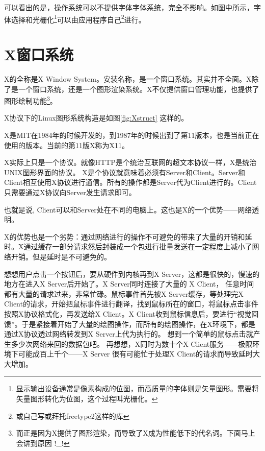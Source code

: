 
可以看出的是，操作系统可以不提供字体字体系统，完全不影响。如图中所示，字体选择和光栅化\footnote{显示输出设备通常是像素构成的位图，而高质量的字体则是矢量图形。需要将矢量图形转化为位图，这个过程叫光栅化。}可以由应用程序自己\footnote{或自己写或拜托freetype2这样的库}进行。

\section{X窗口系统}

X的全称是X Window System。安装名称，是一个窗口系统。其实并不全面。X除了是一个窗口系统，还是一个图形渲染系统。X不仅提供窗口管理功能，也提供了图形绘制功能\footnote{而正是因为X提供了图形渲染，而导致了X成为性能低下的代名词。下面马上会讲到原因 !\_!}。

X协议下的Linux图形系统构造是如图\ref{fig:Xstruct} 这样的。

X是MIT在1984年的时候开发的，到1987年的时候出到了第11版本，也是当前正在使用的版本。当前的第11版X称为X11。

X实际上只是一个协议。就像HTTP是个统治互联网的超文本协议一样，X是统治UNIX图形界面的协议。
X是个协议就意味着必须有Server和Client。Server和Client相互使用X协议进行通信。所有的操作都是Server代为Client进行的。Client只需要通过X协议向Server发生请求即可。

也就是说, Client可以和Server处在不同的电脑上。这也是X的一个优势——网络透明。


X的优势也是一个劣势：通过网络进行的操作不可避免的带来了大量的开销和延时。X通过缓存一部分请求然后封装成一个包进行批量发送在一定程度上减小了网络开销。但是延时是不可避免的。

\begin{notice}

想想用户点击一个按钮后，要从硬件到内核再到X Server，这都是很快的，慢速的地方在进入X Server后开始了。X Server同时连接了大量的 X Client， 任意时间都有大量的请求过来，非常忙碌。鼠标事件首先被X Server缓存，等处理完X Client的请求，开始把鼠标事件进行翻译，找到鼠标所在的窗口，将鼠标点击事件按照X协议格式化，再发送给X Client。X Client收到鼠标信息后，要进行“视觉回馈”。于是紧接着开始了大量的绘图操作，而所有的绘图操作，在X环境下，都是通过X协议透过网络转发到X Server上代为执行的。
想到一个简单的鼠标点击就产生多少次网络来回的数据包吧。 再想想，X同时为数十个X Client服务——极限环境下可能成百上千个——X Server 很有可能忙于处理X Client的请求而导致延时大大增加。



\end{notice}


